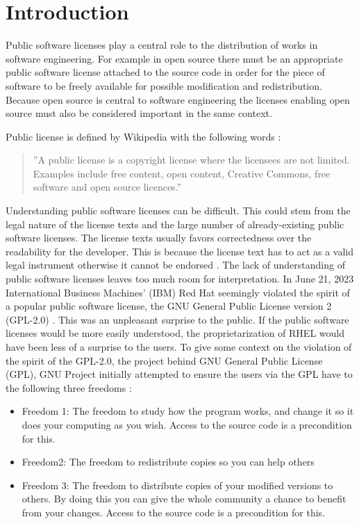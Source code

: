 \chapter{Introduction\label{intro}}
Public software licenses play a central role to the distribution of works in software engineering. For example in open source there must be an appropriate public software license attached to the source code in order for the piece of software to be freely available for possible modification and redistribution. Because open source is central to software engineering the licenses enabling open source must also be considered important in the same context.

Public license is defined by Wikipedia with the following words \citep{wikipedia:publiclicenses}:
\begin{quote}
	''A public license is a copyright license where the licensees are not limited. Examples include free content, open content, Creative Commons, free software and open source licences.''
\end{quote}

Understanding public software licenses can be difficult. This could stem from the legal nature of the license texts and the large number of already-existing public software licenses. The license texts usually favors correctedness over the readability for the developer. This is because the license text has to act as a valid legal instrument otherwise it cannot be endorsed \citep{ferguson2006gpl}. The lack of understanding of public software licenses leaves too much room for interpretation. In June 21, 2023 International Business Machines' (IBM) Red Hat seemingly violated the spirit of a popular public software license, the GNU General Public License version 2 (GPL-2.0) \citep{sfc:rhel} \citep{ibm:rhel}. This was an unpleasant surprise to the public. If the public software licenses would be more easily understood, the proprietarization of RHEL would have been less of a surprise to the users. To give some context on the violation of the spirit of the GPL-2.0, the project behind GNU General Public License (GPL), GNU Project initially attempted to ensure the users via the GPL have to the following three freedoms \citep{gnu:free}:
\begin{itemize}
	\item Freedom 1:	The freedom to study how the program works, and change it so it does your computing as you wish. Access to the source code is a precondition for this.
	\item Freedom2: The freedom to redistribute copies so you can help others
	\item Freedom 3:	The freedom to distribute copies of your modified versions to others. By doing this you can give the whole community a chance to benefit from your changes. Access to the source code is a precondition for this.
\end{itemize}


